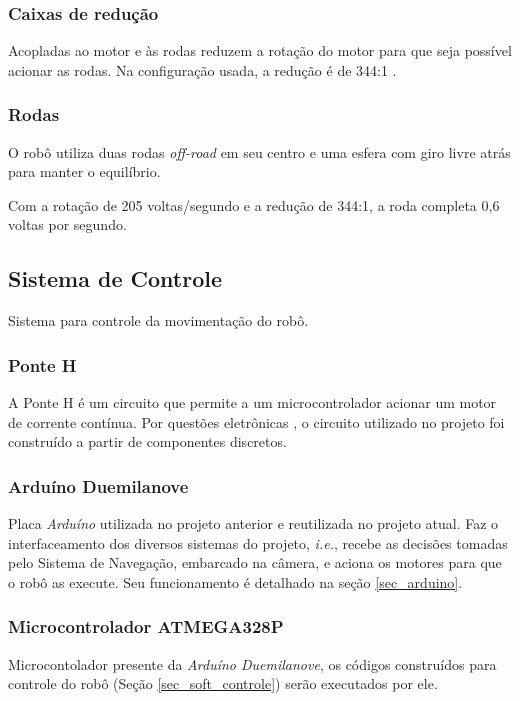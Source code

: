 \subsubsection{Caixas de redução}
Acopladas ao motor e às rodas reduzem a rotação do motor para que seja possível acionar as rodas. Na configuração usada, a redução é de 344:1 \cite{Robo2d}.

\subsubsection{Rodas}
O robô utiliza duas rodas \textit{off-road} em seu centro e uma esfera com giro livre atrás para manter o equilíbrio.

Com a rotação de 205 voltas/segundo e a redução de 344:1, a roda completa 0,6 voltas por segundo.

\subsection{Sistema de Controle}

Sistema para controle da movimentação do robô.

\subsubsection{Ponte H} 

A Ponte H é um circuito que permite a um microcontrolador acionar um motor de corrente contínua. Por questões eletrônicas \cite{Robo2d}, o circuito utilizado no projeto foi construído a partir de componentes discretos.

\subsubsection{Arduíno Duemilanove}

Placa \textit{Arduíno} utilizada no projeto anterior e reutilizada no projeto atual. Faz o interfaceamento dos diversos sistemas do projeto, \textit{i.e.}, recebe as decisões tomadas pelo Sistema de Navegação, embarcado na câmera, e aciona os motores para que o robô as execute. Seu funcionamento é detalhado na seção \ref{sec_arduino}.

\subsubsection{Microcontrolador ATMEGA328P}

Microcontolador presente da \textit{Arduíno Duemilanove}, os códigos construídos para controle do robô (Seção \ref{sec_soft_controle}) serão executados por ele.

